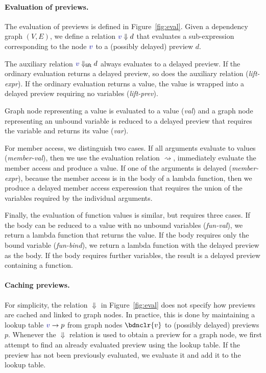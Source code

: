 \documentclass[sigplan,10pt]{acmart}\settopmatter{printfolios=true,printccs=false,printacmref=false}
\theoremstyle{plain}
\theoremstyle{definition}
\newcommand{\ident}[1]{\textnormal{\sffamily #1}}
\newcommand{\bndclr}[1]{\textcolor{kvdclr}{#1}}
\begin{document}
\paragraph{Evaluation of previews.}
The evaluation of previews is defined in Figure~\ref{fig:eval}. Given a dependency graph $(V, E)$,
we define a relation $\bndclr{v}\Downarrow d$ that evaluates a sub-expression corresponding to 
the node $\bndclr{v}$ to a (possibly delayed) preview $d$. 

The auxiliary relation $\bndclr{v}\Downarrow_{\ident{lift}} d$ always evaluates
to a delayed preview. If the ordinary evaluation returns a delayed preview, so does the auxiliary
relation (\emph{lift-expr}). If the ordinary evaluation returns a value, the value is wrapped
into a delayed preview requiring no variables (\emph{lift-prev}).

Graph node representing a value is evaluated to a value (\emph{val}) and a graph node representing
an unbound variable is reduced to a delayed preview that requires the variable and returns its
value (\emph{var}).

For member access, we distinguish two cases. If all arguments evaluate to values (\emph{member-val}),
then we use the evaluation relation $\rightsquigarrow$, immediately evaluate the member access and 
produce a value. If one of the arguments is delayed (\emph{member-expr}), because the member access 
is in the body of a lambda function, then we produce a delayed member access experession that
requires the union of the variables required by the individual arguments.

Finally, the evaluation of function values is similar, but requires three cases. If the body can 
be reduced to a value with no unbound variables (\emph{fun-val}), we return a lambda function that
returns the value. If the body requires only the bound variable (\emph{fun-bind}), we return a 
lambda function with the delayed preview as the body. If the body requires further variables,
the result is a delayed preview containing a function.

\paragraph{Caching previews.}
For simplicity, the relation $\Downarrow$ in Figure~\ref{fig:eval} does not specify how previews 
are cached and linked to graph nodes. In practice, this is done by maintaining a lookup table
$\bndclr{v} \rightarrow p$ from graph nodes $\bdnclr{v}$ to (possibly delayed) previews $p$.
Whenever the $\Downarrow$ relation is used to obtain a preview for a graph node, we first 
attempt to find an already evaluated preview using the lookup table. If the preview has not
been previously evaluated, we evaluate it and add it to the lookup table.
\end{document}
